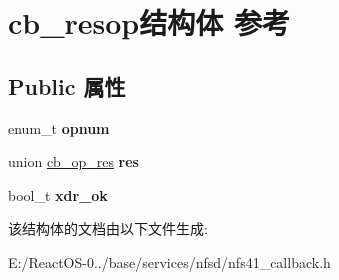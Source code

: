 \hypertarget{structcb__resop}{}\section{cb\+\_\+resop结构体 参考}
\label{structcb__resop}
\subsection*{Public 属性}
\begin{DoxyCompactItemize}
\item 
\mbox{\label{structcb__resop_abf3b5923e81422ee63beed159aef80f0}} 
enum\+\_\+t {\bfseries opnum}
\item 
\mbox{\label{structcb__resop_a0803a5439c03b9f792d690fa15b69e6c}} 
union \hyperlink{unioncb__op__res}{cb\+\_\+op\+\_\+res} {\bfseries res}
\item 
\mbox{\label{structcb__resop_a3a9b9e7dfdce994240697cc1c82ddd0d}} 
bool\+\_\+t {\bfseries xdr\+\_\+ok}
\end{DoxyCompactItemize}


该结构体的文档由以下文件生成\+:\begin{DoxyCompactItemize}
\item 
E\+:/\+React\+O\+S-\/0../base/services/nfsd/nfs41\+\_\+callback.\+h\end{DoxyCompactItemize}
